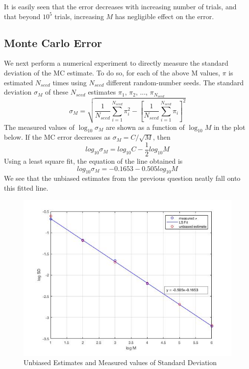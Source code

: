 \documentclass[12pt, oneside]{article}   	%
\begin{document}
	It is easily seen that the error decreases with increasing number of trials, and that beyond $10^5$ trials, increasing $M$ has negligible effect on the error.	


\subsection{Monte Carlo Error}
We next perform a numerical experiment to directly measure the standard deviation of the MC estimate. To do so, for each of the above M values, $\pi$ is estimated $N_{seed}$ times using $N_{seed}$ different random-number seeds. The standard deviation $\sigma_M$ of these $N_{seed}$ estimates $\pi_1$, $\pi_2$, ..., $\pi_{N_{seed}}$
	\begin{equation}
	\sigma_M = \sqrt{\frac{1}{N_{seed}} \sum\limits_{i=1}^{N_{seed}} \pi_i^2 - \left[ \frac{1}{N_{seed}}\sum\limits_{i=1}^{N_{seed}} \pi_i\right]^2 }
	\end{equation}
The measured values of $\log_{10} \sigma_M$ are shown as a function of $\log_{10} M$ in the plot below. If the MC error decreases as $\sigma_M = C/\sqrt{M}$, then  
$$log_{10}\sigma_M = log_{10}C - \frac{1}{2} log_{10}M $$
Using a least square fit, the equation of the line obtained is
 $$log_{10}\sigma_M = -0.1653 - 0.505 log_{10}M $$
We see that the unbiased estimates from the previous question neatly fall onto this fitted line.
 	\begin{figure} [!htbp]
	\centering
	 \includegraphics[scale=0.75]{stdv_fit.jpg}
	\caption{Unbiased Estimates and Measured values of Standard Deviation}
	\end{figure}
	
\end{document}
